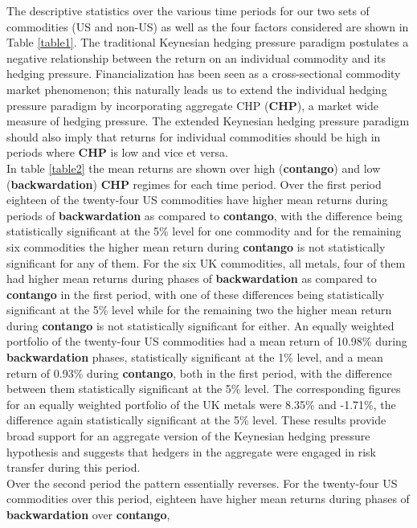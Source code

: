 \documentclass[12pt,]{article}
\begin{document}
The descriptive statistics over the various time periods for our two
sets of commodities (US and non-US) as well as the four factors
considered are shown in Table \ref{table1}. The traditional Keynesian
hedging pressure paradigm postulates a negative relationship between the
return on an individual commodity and its hedging pressure.
Financialization has been seen as a cross-sectional commodity market
phenomenon; this naturally leads us to extend the individual hedging
pressure paradigm by incorporating aggregate CHP (\textbf{CHP}), a
market wide measure of hedging pressure. The extended Keynesian hedging
pressure paradigm should also imply that returns for individual
commodities should be high in periods where \textbf{CHP} is low and vice
et versa.\\
In table \ref{table2} the mean returns are shown over high
(\textbf{contango}) and low (\textbf{backwardation}) \textbf{CHP}
regimes for each time period. Over the first period eighteen of the
twenty-four US commodities have higher mean returns during periods of
\textbf{backwardation} as compared to \textbf{contango}, with the
difference being statistically significant at the 5\% level for one
commodity and for the remaining six commodities the higher mean return
during \textbf{contango} is not statistically significant for any of
them. For the six UK commodities, all metals, four of them had higher
mean returns during phases of \textbf{backwardation} as compared to
\textbf{contango} in the first period, with one of these differences
being statistically significant at the 5\% level while for the remaining
two the higher mean return during \textbf{contango} is not statistically
significant for either. An equally weighted portfolio of the twenty-four
US commodities had a mean return of 10.98\% during
\textbf{backwardation} phases, statistically significant at the 1\%
level, and a mean return of 0.93\% during \textbf{contango}, both in the
first period, with the difference between them statistically significant
at the 5\% level. The corresponding figures for an equally weighted
portfolio of the UK metals were 8.35\% and -1.71\%, the difference again
statistically significant at the 5\% level. These results provide broad
support for an aggregate version of the Keynesian hedging pressure
hypothesis and suggests that hedgers in the aggregate were engaged in
risk transfer during this period.\\
Over the second period the pattern essentially reverses. For the
twenty-four US commodities over this period, eighteen have higher mean
returns during phases of \textbf{backwardation} over \textbf{contango},
\end{document}
